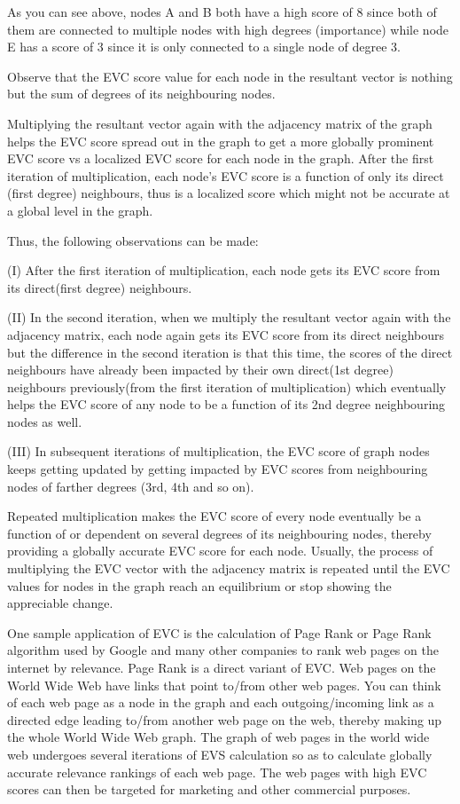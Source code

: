 \documentclass[12pt, a4paper]{article}
\begin{document}
\begin{flushleft}
    As you can see above, nodes A and B both have a high score of 8 since both of them are connected to multiple nodes with high degrees (importance) while node E has a score of 3 since it is only connected to a single node of degree 3.
    
    Observe that the EVC score value for each node in the resultant vector is nothing but the sum of degrees of its neighbouring nodes.
    
    Multiplying the resultant vector again with the adjacency matrix of the graph helps the EVC score spread out in the graph to get a more globally prominent EVC score vs a localized EVC score for each node in the graph. After the first iteration of multiplication, each node’s EVC score is a function of only its direct (first degree) neighbours, thus is a localized score which might not be accurate at a global level in the graph.

    Thus, the following observations can be made:
    
    (I)     After the first iteration of multiplication, each node gets its EVC score from its direct(first degree) neighbours.
    
    (II)	In the second iteration, when we multiply the resultant vector again with the adjacency matrix, each node again gets its EVC score from its direct neighbours but the difference in the second iteration is that this time, the scores of the direct neighbours have already been impacted by their own direct(1st degree) neighbours previously(from the first iteration of multiplication) which eventually helps the EVC score of any node to be a function of its 2nd degree neighbouring nodes as well.
    
    (III)	In subsequent iterations of multiplication, the EVC score of graph nodes keeps getting updated by getting impacted by EVC scores from neighbouring nodes of farther degrees (3rd, 4th and so on).

    Repeated multiplication makes the EVC score of every node eventually be a function of or dependent on several degrees of its neighbouring nodes, thereby providing a globally accurate EVC score for each node. Usually, the process of multiplying the EVC vector with the adjacency matrix is repeated until the EVC values for nodes in the graph reach an equilibrium or stop showing the appreciable change.

    One sample application of EVC is the calculation of Page Rank or Page Rank algorithm used by Google and many other companies to rank web pages on the internet by relevance. Page Rank is a direct variant of EVC. Web pages on the World Wide Web have links that point to/from other web pages. You can think of each web page as a node in the graph and each outgoing/incoming link as a directed edge leading to/from another web page on the web, thereby making up the whole World Wide Web graph. The graph of web pages in the world wide web undergoes several iterations of EVS calculation so as to calculate globally accurate relevance rankings of each web page. The web pages with high EVC scores can then be targeted for marketing and other commercial purposes. \cite{Bhasin22}

  \end{flushleft}
\end{document}
